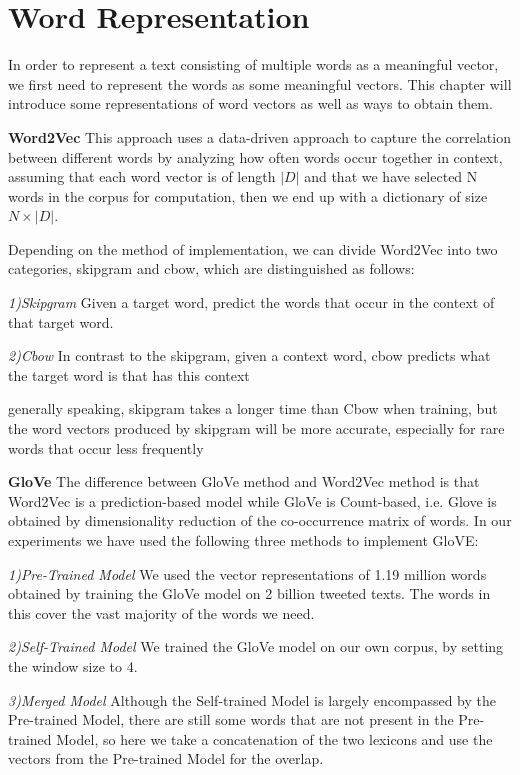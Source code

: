 \documentclass[journal]{IEEEtran}
\begin{document}
\section{Word Representation}
In order to represent a text consisting of multiple words as a meaningful vector, we first need to represent the words as some meaningful vectors. This chapter will introduce some representations of word vectors as well as ways to obtain them.

\textbf{Word2Vec}  This approach uses a data-driven approach to capture the correlation between different words by analyzing how often words occur together in context, assuming that each word vector is of length $\lvert D \rvert$ and that we have selected N words in the corpus for computation, then we end up with a dictionary of size $N \times |D|$.

Depending on the method of implementation, we can divide Word2Vec into two categories, skipgram and cbow, which are distinguished as follows:

\textit{1)Skipgram} Given a target word, predict the words that occur in the context of that target word.

\textit{2)Cbow} In contrast to the skipgram, given a context word, cbow predicts what the target word is that has this context

generally speaking, skipgram takes a longer time than Cbow when training, but the word vectors produced by skipgram will be more accurate, especially for rare words that occur less frequently

\textbf{GloVe} The difference between GloVe method and Word2Vec method is that Word2Vec is a prediction-based model while GloVe is Count-based, i.e. Glove is obtained by dimensionality reduction of the co-occurrence matrix of words. In our experiments we have used the following three methods to implement GloVE:

\textit{1)Pre-Trained Model} We used the vector representations of 1.19 million words obtained by training the GloVe model on 2 billion tweeted texts. The words in this cover the vast majority of the words we need.

\textit{2)Self-Trained Model} We trained the GloVe model on our own corpus, by setting the window size to 4.

\textit{3)Merged Model} Although the Self-trained Model is largely encompassed by the Pre-trained Model, there are still some words that are not present in the Pre-trained Model, so here we take a concatenation of the two lexicons and use the vectors from the Pre-trained Model for the overlap.
\end{document}
